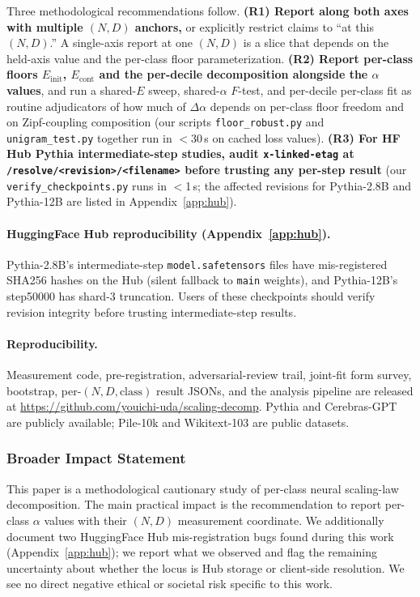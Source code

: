 \documentclass[10pt]{article}
\newcommand{\dalpha}{\Delta\alpha}
\begin{document}
Three methodological recommendations follow.
\textbf{(R1) Report along both axes with multiple $(N, D)$ anchors,}
or explicitly restrict claims to ``at this $(N, D)$.'' A single-axis
report at one $(N, D)$ is a slice that depends on the held-axis value
and the per-class floor parameterization.
\textbf{(R2) Report per-class floors $E_\mathrm{init}$,
$E_\mathrm{cont}$ and the per-decile decomposition alongside the
$\alpha$ values}, and run a shared-$E$ sweep, shared-$\alpha$
$F$-test, and per-decile per-class fit as routine adjudicators of how
much of $\dalpha$ depends on per-class floor freedom and on
Zipf-coupling composition (our scripts \texttt{floor\_robust.py} and
\texttt{unigram\_test.py} together run in $<$30\,s on cached loss
values).
\textbf{(R3) For HF Hub Pythia intermediate-step studies, audit
\texttt{x-linked-etag} at \texttt{/resolve/<revision>/<filename>}
before trusting any per-step result} (our
\texttt{verify\_checkpoints.py} runs in $<$1\,s; the affected
revisions for Pythia-2.8B and Pythia-12B are listed in
Appendix~\ref{app:hub}).

\paragraph{HuggingFace Hub reproducibility (Appendix~\ref{app:hub}).}
Pythia-2.8B's intermediate-step \verb|model.safetensors| files have
mis-registered SHA256 hashes on the Hub (silent fallback to
\verb|main| weights), and Pythia-12B's step50000 has shard-3
truncation. Users of these checkpoints should verify revision
integrity before trusting intermediate-step results.

\paragraph{Reproducibility.} Measurement code, pre-registration,
adversarial-review trail, joint-fit form survey, bootstrap, per-$(N,
D, \mathrm{class})$ result JSONs, and the analysis pipeline are
released at
\url{https://github.com/youichi-uda/scaling-decomp}.
Pythia and Cerebras-GPT are publicly available; Pile-10k
\citep{gao2020pile} and Wikitext-103 \citep{merity2017wikitext} are
public datasets.

\subsubsection*{Broader Impact Statement}
This paper is a methodological cautionary study of per-class
neural scaling-law decomposition. The main practical impact is the
recommendation to report per-class $\alpha$ values with their
$(N, D)$ measurement coordinate. We additionally document two
HuggingFace Hub mis-registration bugs found during this work
(Appendix~\ref{app:hub}); we report what we observed and flag the
remaining uncertainty about whether the locus is Hub storage or
client-side resolution. We see no direct negative ethical or
societal risk specific to this work.
\end{document}
